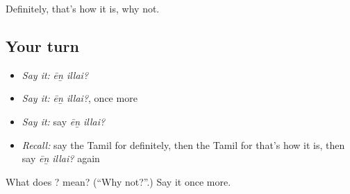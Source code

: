 \begin{grammarlens}[title={What you've built}]
Definitely, that's how it is, why not.
\end{grammarlens}

\subsection*{Your turn}
\begin{itemize}
\raggedright
  \item \emph{Say it:} \emph{ēṉ illai?}
  \item \emph{Say it:} \emph{ēṉ illai?}, once more
  \item \emph{Say it:} say \emph{ēṉ illai?}
  \item \emph{Recall:} say the Tamil for definitely, then the Tamil for that's how it is, then say \emph{ēṉ illai?} again
\end{itemize}

\begin{tcolorbox}[breakable,colback=teal!4,colframe=teal!35!black,title={Before you move on}]
What does  ? mean? (\textquotedblleft{}Why not?\textquotedblright{}.) Say it once more.
\end{tcolorbox}
